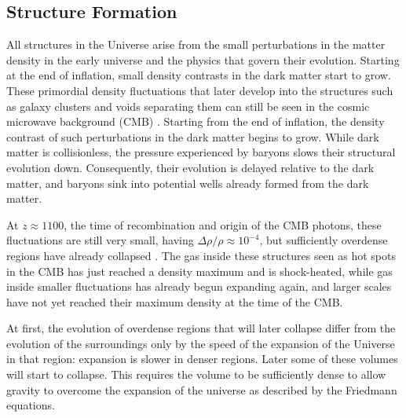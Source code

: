\documentclass[english, oneside]{HYgradu}
\begin{document}
\subsection{Structure Formation} \label{universe-structure}
All structures in the Universe arise from the small perturbations in the matter density in the early universe and the physics that govern their evolution. Starting at the end of inflation, small density contrasts in the dark matter start to grow. These primordial density fluctuations that later develop into the structures such as galaxy clusters and voids separating them can still be seen in the cosmic microwave background (CMB) \citep{planck2016resultsI}. Starting from the end of inflation, the density contrast of such perturbations in the dark matter begins to grow. While dark matter is collisionless, the pressure experienced by baryons slows their structural evolution down. Consequently, their evolution is delayed relative to the dark matter, and baryons sink into potential wells already formed from the dark matter.

At $z \approx 1100$, the time of recombination and origin of the CMB photons, these fluctuations are still very small, having $\Delta\rho/\rho \approx 10^{-4}$, but sufficiently overdense regions have already collapsed \citep{mo2010galaxy}. The gas inside these structures seen as hot spots in the CMB has just reached a density maximum and is shock-heated, while gas inside smaller fluctuations has already begun expanding again, and larger scales have not yet reached their maximum density at the time of the CMB.

At first, the evolution of overdense regions that will later collapse differ from the evolution of the surroundings only by the speed of the expansion of the Universe in that region: expansion is slower in denser regions. Later some of these volumes will start to collapse. This requires the volume to be sufficiently dense to allow gravity to overcome the expansion of the universe as described by the Friedmann equations.
\end{document}

